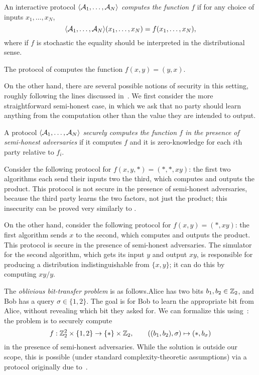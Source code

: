 \begin{dfn}
An interactive protocol $\langle\mathcal{A}_1,\dots,\mathcal{A}_N\rangle$ \emph{computes the function $f$}
if for any choice of inputs $x_1,\dots,x_N$, \[ \langle\mathcal{A}_1, \dots,
  \mathcal{A}_N\rangle(x_1,\dots,x_N) = f(x_1,\dots,x_N),
\] where if $f$ is stochastic the equality should be interpreted in the
distributional sense.
\end{dfn}

\begin{ex}
  The protocol of  computes the function $f(x,y) = (y,x)$.
\end{ex}

On the other hand, there are several possible notions of security in this
setting, roughly following the lines discussed
in~.
We first consider the more straightforward semi-honest case, in which we ask
that no party should learn anything from the computation other than the value
they are intended to output.

\begin{dfn}\label{def:semi-honest-secure}
  A protocol $\langle\mathcal{A}_1,\dots,\mathcal{A}_N\rangle$ \emph{securely computes the function $f$ in
  the presence of semi-honest adversaries} if it computes $f$ and it is
  zero-knowledge for each $i$th party relative to $f_i$.
\end{dfn}

\begin{ex}
  Consider the following protocol for $f(x, y, *) = (*, *, xy)$: the first two
  algorithms each send their inputs two the third, which computes and outputs the
  product. This protocol is not secure in the presence of semi-honest
  adversaries, because the third party learns the two factors, not just the
  product; this insecurity can be proved very similarly to
  .

  On the other hand, consider the following protocol for $f(x, y) = (*, xy)$:
  the first algorithm sends $x$ to the second, which computes and outputs the
  product. This protocol is secure in the presence of semi-honest adversaries.
  The simulator for the second algorithm, which gets its input $y$ and output
  $xy$, is responsible for producing a distribution indistinguishable from $\{x,
  y\}$; it can do this by computing $xy / y$.
\end{ex}

\begin{ex}
  The \emph{oblivious bit-transfer problem} is as follows.Alice has two
  bits $b_1,b_2\in\mathbb{Z}_2$, and Bob has a query $\sigma\in\{1,2\}$.
  The goal is for Bob to learn the appropriate bit from Alice,
  without revealing which bit they asked for. We can formalize this
  using~: the problem is to securely
  compute \[
    f: \mathbb{Z}_2^2\times \{1,2\}\to \{*\}\times\mathbb{Z}_2,\quad\quad ((b_1,b_2), \sigma) \mapsto (*, b_\sigma)
  \]in the presence of semi-honest adversaries. While the solution is outside
  our scope, this is possible (under standard complexity-theoretic assumptions)
  via a protocol originally due to~\cite{even-et-al-1985}.
\end{ex}

